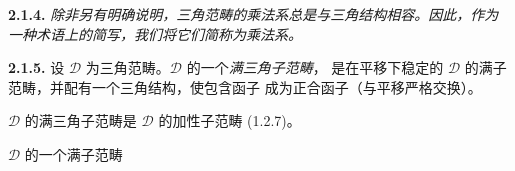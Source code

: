 \medskip
\noindent\textbf{2.1.4.}\quad
{}
\emph{除非另有明确说明，三角范畴的乘法系总是与三角结构相容。因此，作为
一种术语上的简写，我们将它们简称为乘法系。}

\medskip
\noindent\textbf{2.1.5.}\quad
{}
设 $\mathcal D$ 为三角范畴。$\mathcal D$ 的一个\emph{满三角子范畴}，
是在平移下稳定的 $\mathcal D$ 的满子范畴，并配有一个三角结构，使包含函子
成为正合函子（与平移严格交换）。

$\mathcal D$ 的满三角子范畴是 $\mathcal D$ 的加性子范畴 (1.2.7)。

$\mathcal D$ 的一个满子范畴
\endgroup
